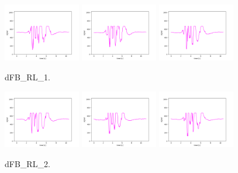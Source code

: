 \begin{figure}[!ht]
\begin{center}
\includegraphics[width=0.3\textwidth]{../data/dFB_RL_1/dFB_RL_1_1.png}
\includegraphics[width=0.3\textwidth]{../data/dFB_RL_1/dFB_RL_1_2.png}
\includegraphics[width=0.3\textwidth]{../data/dFB_RL_1/dFB_RL_1_3.png}
\caption{dFB\_RL\_1.\label{fig:dFB_RL_1}}
\end{center}
\end{figure}

\begin{figure}[!ht]
\begin{center}
\includegraphics[width=0.3\textwidth]{../data/dFB_RL_2/dFB_RL_2_1.png}
\includegraphics[width=0.3\textwidth]{../data/dFB_RL_2/dFB_RL_2_2.png}
\includegraphics[width=0.3\textwidth]{../data/dFB_RL_2/dFB_RL_2_3.png}
\caption{dFB\_RL\_2.\label{fig:dFB_RL_2}}
\end{center}
\end{figure}


